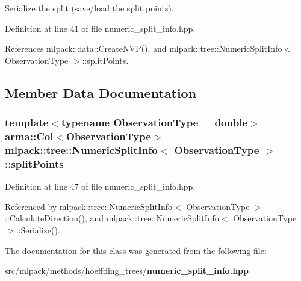 Serialize the split (save/load the split points). 



Definition at line 41 of file numeric\+\_\+split\+\_\+info.\+hpp.



References mlpack\+::data\+::\+Create\+N\+V\+P(), and mlpack\+::tree\+::\+Numeric\+Split\+Info$<$ Observation\+Type $>$\+::split\+Points.



\subsection{Member Data Documentation}
\subsubsection[{split\+Points}]{\setlength{\rightskip}{0pt plus 5cm}template$<$typename Observation\+Type  = double$>$ arma\+::\+Col$<$Observation\+Type$>$ {\bf mlpack\+::tree\+::\+Numeric\+Split\+Info}$<$ Observation\+Type $>$\+::split\+Points\hspace{0.3cm}{\ttfamily [private]}}\label{classmlpack_1_1tree_1_1NumericSplitInfo_a412b1f69c08315c03b2b9de5422162a6}


Definition at line 47 of file numeric\+\_\+split\+\_\+info.\+hpp.



Referenced by mlpack\+::tree\+::\+Numeric\+Split\+Info$<$ Observation\+Type $>$\+::\+Calculate\+Direction(), and mlpack\+::tree\+::\+Numeric\+Split\+Info$<$ Observation\+Type $>$\+::\+Serialize().



The documentation for this class was generated from the following file\+:\begin{DoxyCompactItemize}
\item 
src/mlpack/methods/hoeffding\+\_\+trees/{\bf numeric\+\_\+split\+\_\+info.\+hpp}\end{DoxyCompactItemize}
